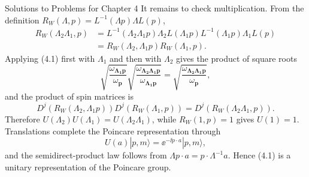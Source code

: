 \begin{bankssolutions}{Solutions to Problems for Chapter 4}
It remains to check multiplication.  From the definition
$R_W(\Lambda,p)=L^{-1}(\Lambda p)\Lambda L(p)$,
\begin{align*}
 R_W(\Lambda_2\Lambda_1,p)
 &=L^{-1}(\Lambda_2\Lambda_1p)\Lambda_2L(\Lambda_1p)
   L^{-1}(\Lambda_1p)\Lambda_1L(p)\\
 &=R_W(\Lambda_2,\Lambda_1p)R_W(\Lambda_1,p).
\end{align*}
Applying (4.1) first with $\Lambda_1$ and then with $\Lambda_2$ gives the
product of square roots
\begin{equation*}
 \sqrt{\frac{\omega_{\boldsymbol{\Lambda_1p}}}{\omega_{\mathbf p}}}
 \sqrt{\frac{\omega_{\boldsymbol{\Lambda_2\Lambda_1p}}}{\omega_{\boldsymbol{\Lambda_1p}}}}
 =\sqrt{\frac{\omega_{\boldsymbol{\Lambda_2\Lambda_1p}}}{\omega_{\mathbf p}}},
\end{equation*}
and the product of spin matrices is
\begin{equation*}
 D^j(R_W(\Lambda_2,\Lambda_1p))D^j(R_W(\Lambda_1,p))
 =D^j(R_W(\Lambda_2\Lambda_1,p)).
\end{equation*}
Therefore $U(\Lambda_2)U(\Lambda_1)=U(\Lambda_2\Lambda_1)$, while
$R_W(1,p)=1$ gives $U(1)=1$.  Translations complete the Poincare
representation through
\begin{equation*}
 U(a)|p,m\rangle=\ee^{-\ii p\cdot a}|p,m\rangle,
\end{equation*}
and the semidirect-product law follows from
$\Lambda p\cdot a=p\cdot\Lambda^{-1}a$.  Hence (4.1) is a unitary
representation of the Poincare group.

\end{bankssolutions}
